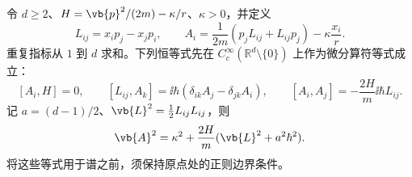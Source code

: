 \begin{lemma}
令 $d\ge2$、$H=\vb{p}^2/(2m)-\kappa/r$、$\kappa>0$，并定义
\begin{equation}
 L_{ij}=x_ip_j-x_jp_i,\qquad
 A_i=\frac1{2m}(p_jL_{ij}+L_{ij}p_j)-\kappa\frac{x_i}{r}.
 \label{eq:phys-hdqm-runge-lenz-d}
\end{equation}
重复指标从 $1$ 到 $d$ 求和。下列恒等式先在 $C_c^\infty(\mathbb R^d\setminus\{0\})$ 上作为微分算符等式成立：
\[
 [A_i,H]=0,\qquad
 [L_{ij},A_k]=\ii\hbar(\delta_{ik}A_j-\delta_{jk}A_i),\qquad
 [A_i,A_j]=-\frac{2H}{m}\ii\hbar L_{ij}.
\]
记 $a=(d-1)/2$、$\vb{L}^2=\tfrac12L_{ij}L_{ij}$，则
\begin{equation}
 \vb{A}^2=\kappa^2+\frac{2H}{m}(\vb{L}^2+a^2\hbar^2).
 \label{eq:phys-hdqm-runge-lenz-casimir-d}
\end{equation}
将这些等式用于谱之前，须保持原点处的正则边界条件。
\end{lemma}
